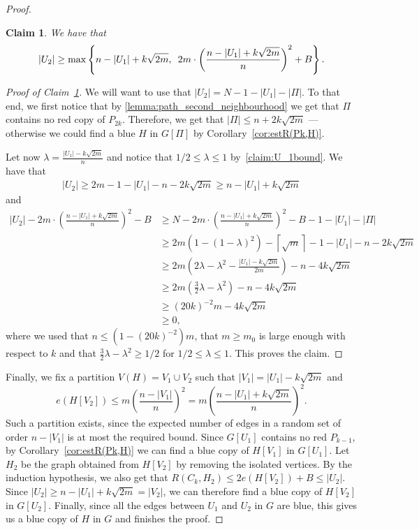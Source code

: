 \documentclass{article}
\newtheorem{claim}[theorem]{Claim}
\newcommand*{\myproofname}{Proof}
\newenvironment{claimproof}[1][\myproofname]{\begin{proof}[#1]\renewcommand*{\qedsymbol}{\(\diamondsuit\)}}{\end{proof}}
\newcommand*{\bceil}[1]{\left\lceil #1\right\rceil}
\begin{document}
\begin{proof}
    \begin{claim}\label{claim:U_2bound}
        We have that
        \[
            |U_2| \geq \max\left\{ n - |U_1| + k\sqrt{2m}, \hspace{5px}  2m \cdot \left( \frac{n - |U_1| + k\sqrt{2m}}{n} \right)^2 + B \right\}.
        \]
    \end{claim}
    \begin{claimproof}[Proof of Claim~\ref{claim:U_2bound}]
        We will want to use that $|U_2| = N -1 - |U_1| - |\Pi|$.
        To that end, we first notice that by \cref{lemma:path_second_neighbourhood} we get that $\Pi$ contains no red copy of $P_{2k}$.
        Therefore, we get that $|\Pi| \leq n  +2k\sqrt{2m}$ --- otherwise we could find a blue $H$ in $G[\Pi]$ by Corollary~\ref{cor:estR(Pk,H)}.

        Let now $\lambda = \frac{|U_1| - k\sqrt{2m}}{n}$ and notice that $1/2 \leq \lambda \leq 1$ by~\cref{claim:U_1bound}.
        We have that
        \begin{align*}
            |U_2| \geq 2m - 1 - |U_1| - n - 2k\sqrt{2m} \geq n - |U_1| + k\sqrt{2m} 
        \end{align*}
        and
        \begin{align*}
            |U_2| - 2m \cdot \left( \frac{n - |U_1|+ k\sqrt{2m}}{n} \right)^2 - B &\geq N - 2m \cdot \left( \frac{n - |U_1|+ k\sqrt{2m}}{n} \right)^2 - B - 1 - |U_1| - |\Pi|\\
            &\geq 2m \left( 1 - (1 - \lambda)^2 \right) - \bceil{\sqrt{m}} - 1 - |U_1| - n -2k\sqrt{2m}\\
            &\geq 2m \left(2\lambda - \lambda^2 - \frac{|U_1| - k\sqrt{2m}}{2m} \right) -n -4k\sqrt{2m}\\
            &\geq 2m \left(\frac{3}{2}\lambda - \lambda^2 \right) - n  - 4k\sqrt{2m}\\
            &\geq (20k)^{-2} m - 4k\sqrt{2m}\\
            &\geq 0,
        \end{align*}
        where we used that $n \leq (1 - (20k)^{-2})m$, that $m \geq m_0$ is large enough with respect to $k$ and that $\frac{3}{2}\lambda -\lambda^2 \geq 1/2$ for $1/2 \leq \lambda \leq 1$.
        This proves the claim.
    \end{claimproof}

    Finally, we fix a partition $V(H) = V_1 \cup V_2$ such that $|V_1| = |U_1| - k\sqrt{2m}$ and
    \[
        e(H[V_2]) \leq m \left( \frac{n -|V_1|}{n} \right)^2 = m \left( \frac{n - |U_1| + k\sqrt{2m}}{n} \right)^2.
    \]
    Such a partition exists, since the expected number of edges in a random set of order $n - |V_1|$ is at most the required bound.
    Since $G[U_1]$ contains no red $P_{k-1}$, by Corollary~\ref{cor:estR(Pk,H)} we can find a blue copy of $H[V_1]$ in $G[U_1]$.
    Let $H_2$ be the graph obtained from $H[V_2]$ by removing the isolated vertices.
    By the induction hypothesis, we also get that $ R(C_k, H_2) \leq 2e(H[V_2]) + B \leq |U_2|$.
    Since $|U_2| \geq n - |U_1| + k\sqrt{2m} = |V_2|$, we can therefore find a blue copy of $H[V_2]$ in $G[U_2]$.
    Finally, since all the edges between $U_1$ and $U_2$ in $G$ are blue, this gives us a blue copy of $H$ in $G$ and finishes the proof.


\end{proof}
\end{document}

